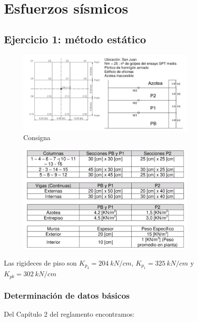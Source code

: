 \documentclass[../main.tex]{subfiles}
\begin{document}
\section{Esfuerzos sísmicos}

\subsection{Ejercicio 1: método estático}


\begin{figure}[h]
  \centering
  \includegraphics[width=0.8\textwidth]{./images/20210420/ej1}
  \caption{Consigna}
  \label{fig:ej1}
\end{figure}

\begin{figure}[h]
  \centering
  \includegraphics[width=0.8\textwidth]{./images/20210420/ej1_1}
\end{figure}

Las rigideces de piso son $K_{p_2}=\SI{204}{kN / cm}$, $K_{p_1}=\SI{325}{kN /cm}$
 y $K_{pb}=\SI{302}{kN / cm}$

\subsubsection{Determinación de datos básicos}

Del Capítulo 2 del reglamento encontramos:
\end{document}
